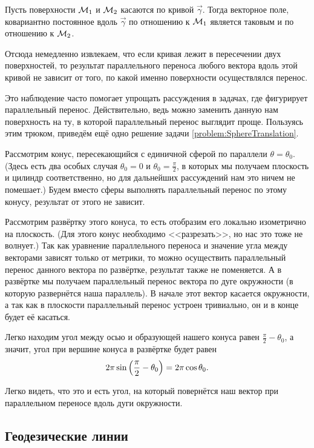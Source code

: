 \begin{proposition}
	Пусть поверхности $\mathcal{M}_1$ и $\mathcal{M}_2$ касаются по кривой $\vec{\gamma}$. Тогда векторное поле, ковариантно постоянное вдоль $\vec{\gamma}$ по отношению к $\mathcal{M}_1$ является таковым и по отношению к $\mathcal{M}_2$.
\end{proposition}

Отсюда немедленно извлекаем, что если кривая лежит в пересечении двух поверхностей, то результат параллельного переноса любого вектора вдоль этой кривой не зависит от того, по какой именно поверхности осуществлялся перенос.

Это наблюдение часто помогает упрощать рассуждения в задачах, где фигурирует параллельный перенос. Действительно, ведь можно заменить данную нам поверхность на ту, в которой параллельный перенос выглядит проще. Пользуясь этим трюком, приведём ещё одно решение задачи \ref{problem:SphereTranslation}.

\begin{secondsolution}
	Рассмотрим конус, пересекающийся с единичной сферой по параллели $\theta = \theta_0$. (Здесь есть два особых случая $\theta_0 = 0$ и $\theta_0 = \frac{\pi}{2}$, в которых мы получаем плоскость и цилиндр соответственно, но для дальнейших рассуждений нам это ничем не помешает.) Будем вместо сферы выполнять параллельный перенос по этому конусу, результат от этого не зависит.

	Рассмотрим развёртку этого конуса, то есть отобразим его локально изометрично на плоскость. (Для этого конус необходимо <<разрезать>>, но нас это тоже не волнует.) Так как уравнение параллельного переноса и значение угла между векторами зависят только от метрики, то можно осуществить параллельный перенос данного вектора по развёртке, результат также не поменяется. А в развёртке мы получаем параллельный перенос вектора по дуге окружности (в которую развернётся наша параллель). В начале этот вектор касается окружности, а так как в плоскости параллельный перенос устроен тривиально, он и в конце будет её касаться.

	Легко находим угол между осью и образующей нашего конуса равен $\frac{\pi}{2} - \theta_0$, а значит, угол при вершине конуса в развёртке будет равен
	\[
		2\pi\sin\left(\frac{\pi}{2} - \theta_0\right) = 2\pi\cos\theta_0.
	\]

	Легко видеть, что это и есть угол, на который повернётся наш вектор при параллельном переносе вдоль дуги окружности.
\end{secondsolution}

\subsection{Геодезические линии}

